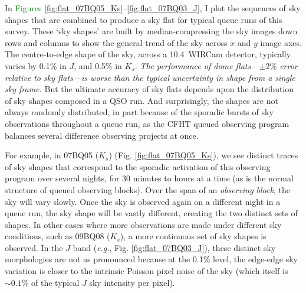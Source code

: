 \documentclass[iop]{emulateapj}
\newcommand{\eg}{\textit{e.g.}}
\newcommand{\todo}[1]{\textcolor{green}{#1}}
\begin{document}
In \todo{Figures} \ref{fig:flat_07BQ05_Ks}--\ref{fig:flat_07BQ03_J}, I plot the sequences of sky shapes that are combined to produce a sky flat for typical queue runs of this survey. These `sky shapes' are built by median-compressing the sky images down rows and columns to show the general trend of the sky across $x$ and $y$ image axes. The centre-to-edge shape of the sky, across a 10.4\arcmin\ WIRCam detector, typically varies by 0.1\% in $J$, and 0.5\% in $K_s$. \emph{The performance of dome flats---$\pm2\%$ error relative to sky flats---is worse than the typical uncertainty in shape from a single sky frame.} But the ultimate accuracy of sky flats depends upon the distribution of sky shapes composed in a QSO run. And surprisingly, the shapes are not always randomly distributed, in part because of the sporadic bursts of sky observations throughout a queue run, as the CFHT queued observing program balances several difference observing projects at once.

For example, in 07BQ05 ($K_s$) (Fig. \ref{fig:flat_07BQ05_Ks}), we see distinct traces of sky shapes that correspond to the sporadic activation of this observing program over several nights, for 30 minutes to hours at a time (as is the normal structure of queued observing blocks). Over the span of an \emph{observing block}, the sky will vary slowly. Once the sky is observed again on a different night in a queue run, the sky shape will be vastly different, creating the two distinct sets of shapes. In other cases where more observations are made under different sky conditions, such as 09BQ08 ($K_s$), a more continuous set of sky shapes is observed. In the $J$ band (\eg, Fig. \ref{fig:flat_07BQ03_J}), these distinct sky morphologies are not as pronounced because at the 0.1\% level, the edge-edge sky variation is closer to the intrinsic Poisson pixel noise of the sky (which itself is $\sim 0.1\%$ of the typical $J$ sky intensity per pixel).


\end{document}
